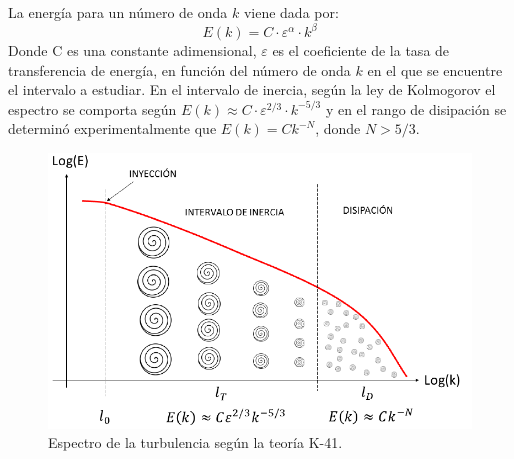 La energía para un número de onda $k$ viene dada por:
\begin{equation}\label{eq:k41}
    E(k)=C\cdot\varepsilon^{\alpha}\cdot k^\beta
\end{equation}
Donde C es una constante adimensional, $\varepsilon$ es el coeficiente de la tasa de transferencia de
energía, en función del número de onda $k$ en el que se encuentre el intervalo a estudiar. En
el intervalo de inercia, según la ley de Kolmogorov el espectro se comporta según 
$E(k)\approx C\cdot\varepsilon^{2/3}\cdot k^{-5/3}$ y en el rango de disipación 
se determinó experimentalmente que $E(k)=Ck^{-N}$, donde $N>5/3$.
\begin{figure}
    \centering
    \includegraphics[scale=0.5]{img/espectro.png}
    \caption{Espectro de la turbulencia según la teoría K-41.}
    \label{fig:espectro}
\end{figure}
